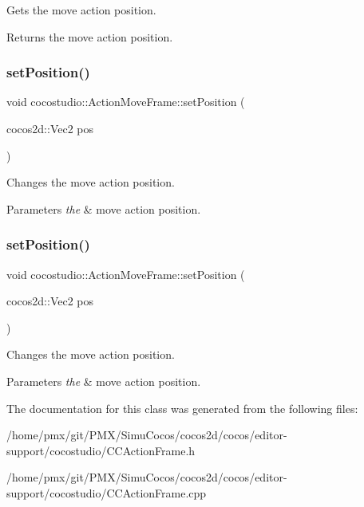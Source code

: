 Gets the move action position.

\begin{DoxyReturn}{Returns}
the move action position. 
\end{DoxyReturn}
\mbox{\label{classcocostudio_1_1ActionMoveFrame_ae4f9685c1b3fdd9e6d50d90729013e03}} 
\subsubsection{\texorpdfstring{set\+Position()}{setPosition()}\hspace{0.1cm}{\footnotesize\ttfamily [1/2]}}
{\footnotesize\ttfamily void cocostudio\+::\+Action\+Move\+Frame\+::set\+Position (\begin{DoxyParamCaption}\item[{cocos2d\+::\+Vec2}]{pos }\end{DoxyParamCaption})}

Changes the move action position.


\begin{DoxyParams}{Parameters}
{\em the} & move action position. \\
\hline
\end{DoxyParams}
\mbox{\label{classcocostudio_1_1ActionMoveFrame_ae4f9685c1b3fdd9e6d50d90729013e03}} 
\subsubsection{\texorpdfstring{set\+Position()}{setPosition()}\hspace{0.1cm}{\footnotesize\ttfamily [2/2]}}
{\footnotesize\ttfamily void cocostudio\+::\+Action\+Move\+Frame\+::set\+Position (\begin{DoxyParamCaption}\item[{cocos2d\+::\+Vec2}]{pos }\end{DoxyParamCaption})}

Changes the move action position.


\begin{DoxyParams}{Parameters}
{\em the} & move action position. \\
\hline
\end{DoxyParams}


The documentation for this class was generated from the following files\+:\begin{DoxyCompactItemize}
\item 
/home/pmx/git/\+P\+M\+X/\+Simu\+Cocos/cocos2d/cocos/editor-\/support/cocostudio/C\+C\+Action\+Frame.\+h\item 
/home/pmx/git/\+P\+M\+X/\+Simu\+Cocos/cocos2d/cocos/editor-\/support/cocostudio/C\+C\+Action\+Frame.\+cpp\end{DoxyCompactItemize}

